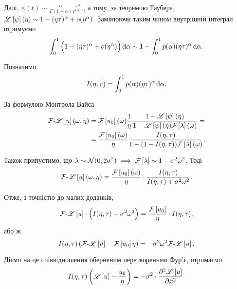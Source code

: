 Далі, $\psi(t) \sim \frac{\alpha}{\Gamma(1 - \alpha)} \frac{\tau^\alpha}{t^{1 + \alpha}}$, а тому, за теоремою Таубера, $\mathscr{L}\left[\psi\right](\eta) \sim 1 - (\eta \tau)^\alpha + o(\eta^\alpha)$. Замінюючи таким чином внутрішній інтеграл отримуємо
\begin{equation}
    \int_0^1 \Big( 1 - (\eta \tau)^\alpha + o(\eta^\alpha) \Big) \mathop{}\!\mathrm{d} \alpha
    \sim 1 - \int_0^1 p(\alpha) (\eta \tau)^\alpha \mathop{}\!\mathrm{d} \alpha.
\end{equation}

Позначимо
\begin{equation}
    I(\eta, \tau) = \int_0^1 p(\alpha) (\eta \tau)^\alpha \mathop{}\!\mathrm{d} \alpha.
\end{equation}

За формулою Монтрола-Вайса
\begin{equation}
    \begin{aligned}
        \mathcal{F}\text{-}\mathscr{L}\left[u\right](\omega, \eta)
        &= \mathcal{F}\left[u_0\right](\omega) \frac{1}{\eta} \frac{1 - \mathscr{L}\left[\psi\right](\eta)}{1 - \mathscr{L}\left[\psi\right](\eta) \mathcal{F}\left[\lambda\right](\omega)} = \\
        &= \frac{\mathcal{F}\left[u_0\right](\omega)}{\eta} \frac{I(\eta, \tau)}{1 - (1 - I(\eta, \tau)) \mathcal{F}\left[\lambda\right](\omega)}.
    \end{aligned}
\end{equation}

Також припустимо, що $\lambda \sim \mathcal{N}(0, 2 \sigma^2) \implies \mathcal{F}\left[\lambda\right] \sim 1 - \sigma^2 \omega^2$. Тоді
\begin{equation}
    \mathcal{F}\text{-}\mathscr{L}\left[u\right](\omega, \eta)
    = \frac{\mathcal{F}\left[u_0\right](\omega)}{\eta} \cdot \frac{I(\eta, \tau)}{I(\eta, \tau) + \sigma^2 \omega^2}.
\end{equation}

Отже, з точністю до малих доданків,
\begin{equation}
    \mathcal{F}\text{-}\mathscr{L}\left[u\right] \cdot \Big( I(\eta, \tau) + \sigma^2 \omega^2 \Big) = \frac{\mathcal{F}\left[u_0\right]}{\eta} \cdot I(\eta, \tau),
\end{equation}
або ж
\begin{equation}
    I(\eta, \tau) \left( \mathcal{F}\text{-}\mathscr{L}\left[u\right] - \mathcal{F}\left[u_0\right]{\eta} \right) = -\sigma^2 \omega^2 \mathcal{F}\text{-}\mathscr{L}\left[u\right].
\end{equation}

Діємо на це співвідношення оберненим перетворенням Фур'є, отримаємо
\begin{equation}
    I(\eta, \tau) \left( \mathscr{L}\left[u\right] - \frac{u_0}{\eta} \right) = -\sigma^2 \cdot \frac{\partial^2 \mathscr{L}\left[u\right]}{\partial x^2}.
\end{equation}

